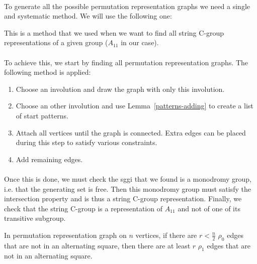 \paragraph{}
To generate all the possible permutation representation graphs we need a single and systematic method. We will use the following one:

\begin{method}
  \label{method}
  This is a method that we used when we want to find all string C-group representations of a given group ($A_{11}$ in our case).

  \paragraph{}
  To achieve this, we start by finding all permutation representation graphs. The following method is applied:

  \begin{enumerate}
    \item Choose an involution and draw the graph with only this involution.
    \item Choose an other involution and use Lemma~\ref{patterns-adding} to create a list of start patterns.
    \item Attach all vertices until the graph is connected. Extra edges can be placed during this step to satisfy various constraints.
    \item Add remaining edges.
  \end{enumerate}

  \paragraph{}
  Once this is done, we must check the sggi that we found is a monodromy group, i.e. that the generating set is free. Then this monodromy group must satisfy the intersection property and is thus a string C-group representation. Finally, we check that the string C-group is a representation of $A_{11}$ and not of one of its transitive subgroup.

\end{method}

\begin{lemma}
  \label{rho0atEnd}
  In permutation representation graph on $n$ vertices, if there are $r < \frac{n}{2}$ $\rho_0$ edges that are not in an alternating square, then there are at least $r$ $\rho_1$ edges that are not in an alternating square.
\end{lemma}


